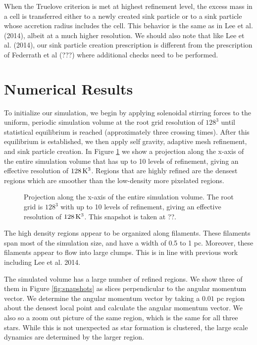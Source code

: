 \documentclass{emulateapj}
\begin{document}
When the Truelove criterion is met at highest refinement level, the excess mass in a cell is transferred either to a newly created sink particle or to a sink particle whose accretion radius includes the cell.  This behavior is the same as in Lee et al. (2014), albeit at a much higher resolution.  We should also note that like Lee et al. (2014), our sink particle creation prescription is different from the prescription of Federrath et al (???) where additional checks need to be performed.


\section{Numerical Results}

To initialize our simulation, we begin by applying solenoidal stirring forces to the uniform, periodic simulation volume at the root grid resolution of $128^3$ until statistical equilibrium is reached (approximately three crossing times).  After this equilibrium is established, we then apply self gravity, adaptive mesh refinement, and sink particle creation.  In Figure \ref{fig:entire projection} we show a projection along the x-axis of the entire simulation volume that has up to 10 levels of refinement, giving an effective resolution of $128\,{\rm K}^3$. Regions that are highly refined are the densest regions which are smoother than the low-density more pixelated regions.
\begin{figure}
\caption{Projection along the x-axis of the entire simulation volume. The root grid is $128^3$ with up to 10 levels of refinement, giving an effective resolution of $128\,{\rm K}^3$. This snapshot is taken at ??. \label{fig:entire projection}}
\end{figure}

The high density regions appear to be organized along filaments.  These filaments span most of the simulation size, and have a width of 0.5 to 1 pc.  Moreover, these filaments appear to flow into large clumps.  This is in line with previous work including Lee et al. 2014.  

The simulated volume has a large number of refined regions.  We show three of them in Figure \ref{fig:snapshots} as slices perpendicular to the angular momentum vector.  We determine the angular momentum vector by taking a $0.01$ pc region about the densest local point and calculate the angular momentum vector.  We also so a zoom out picture of the same region, which is the same for all three stars.  While this is not unexpected as star formation is clustered, the large scale dynamics are determined by the larger region.
\end{document}
